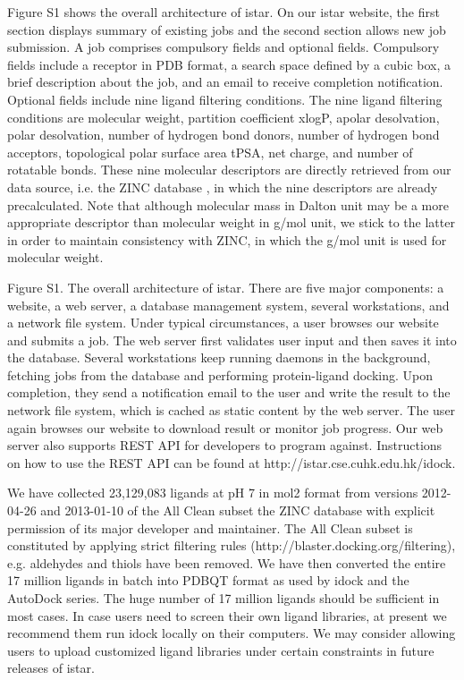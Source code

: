 Figure S1 shows the overall architecture of istar. On our istar website, the first section displays summary of existing jobs and the second section allows new job submission. A job comprises compulsory fields and optional fields. Compulsory fields include a receptor in PDB format, a search space defined by a cubic box, a brief description about the job, and an email to receive completion notification. Optional fields include nine ligand filtering conditions. The nine ligand filtering conditions are molecular weight, partition coefficient xlogP, apolar desolvation, polar desolvation, number of hydrogen bond donors, number of hydrogen bond acceptors, topological polar surface area tPSA, net charge, and number of rotatable bonds. These nine molecular descriptors are directly retrieved from our data source, i.e. the ZINC database \citep{532,1178}, in which the nine descriptors are already precalculated. Note that although molecular mass in Dalton unit may be a more appropriate descriptor than molecular weight in g/mol unit, we stick to the latter in order to maintain consistency with ZINC, in which the g/mol unit is used for molecular weight.

Figure S1. The overall architecture of istar. There are five major components: a website, a web server, a database management system, several workstations, and a network file system. Under typical circumstances, a user browses our website and submits a job. The web server first validates user input and then saves it into the database. Several workstations keep running daemons in the background, fetching jobs from the database and performing protein-ligand docking. Upon completion, they send a notification email to the user and write the result to the network file system, which is cached as static content by the web server. The user again browses our website to download result or monitor job progress. Our web server also supports REST API for developers to program against. Instructions on how to use the REST API can be found at http://istar.cse.cuhk.edu.hk/idock.

We have collected 23,129,083 ligands at pH 7 in mol2 format from versions 2012-04-26 and 2013-01-10 of the All Clean subset the ZINC database \citep{532,1178} with explicit permission of its major developer and maintainer. The All Clean subset is constituted by applying strict filtering rules (http://blaster.docking.org/filtering), e.g. aldehydes and thiols have been removed. We have then converted the entire 17 million ligands in batch into PDBQT format as used by idock and the AutoDock series. The huge number of 17 million ligands should be sufficient in most cases. In case users need to screen their own ligand libraries, at present we recommend them run idock locally on their computers. We may consider allowing users to upload customized ligand libraries under certain constraints in future releases of istar.

